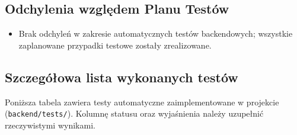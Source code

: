 \documentclass[11pt,a4paper]{article}
\begin{document}
\subsection{Odchylenia względem Planu Testów}
\begin{itemize}
  \item Brak odchyleń w zakresie automatycznych testów backendowych; wszystkie zaplanowane przypadki testowe zostały zrealizowane. 
\end{itemize}

\subsection{Szczegółowa lista wykonanych testów}
Poniższa tabela zawiera testy automatyczne zaimplementowane w projekcie (\texttt{backend/tests/}). Kolumnę statusu oraz wyjaśnienia należy uzupełnić rzeczywistymi wynikami.
\end{document}
